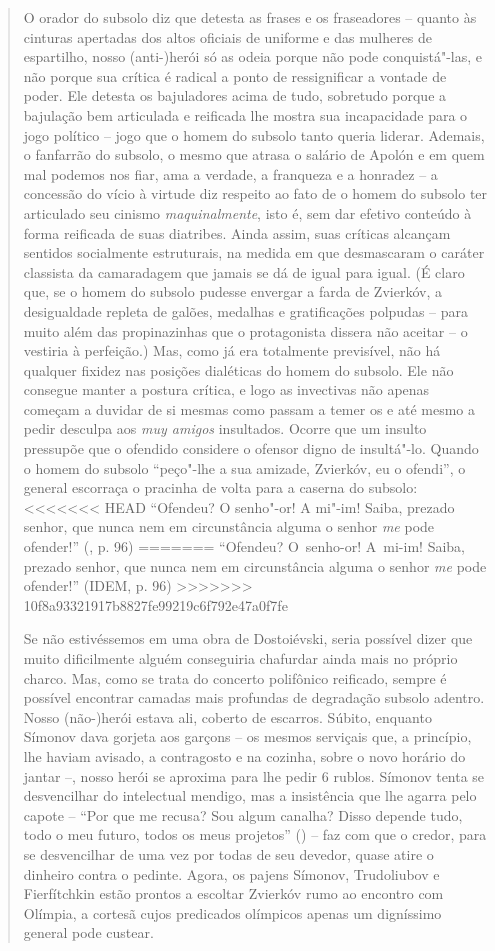 {\begin{quote}
O orador do subsolo diz que detesta as frases e os fraseadores -- quanto
às cinturas apertadas dos altos oficiais de uniforme e das mulheres de
espartilho, nosso (anti-)herói só as odeia porque não pode
conquistá"-las, e não porque sua crítica é radical a ponto de
ressignificar a vontade de poder. Ele detesta os bajuladores acima de
tudo, sobretudo porque a bajulação bem articulada e reificada lhe mostra
sua incapacidade para o jogo político -- jogo que o homem do subsolo
tanto queria liderar. Ademais, o fanfarrão do subsolo, o mesmo que
atrasa o salário de Apolón e em quem mal podemos nos fiar, ama a
verdade, a franqueza e a honradez -- a concessão do vício à virtude diz
respeito ao fato de o homem do subsolo ter articulado seu cinismo
\emph{maquinalmente}, isto é, sem dar efetivo conteúdo à forma reificada
de suas diatribes. Ainda assim, suas críticas alcançam sentidos
socialmente estruturais, na medida em que desmascaram o caráter
classista da camaradagem que jamais se dá de igual para igual. (É claro
que, se o homem do subsolo pudesse envergar a farda de Zvierkóv, a
desigualdade repleta de galões, medalhas e gratificações polpudas --
para muito além das propinazinhas que o protagonista dissera não aceitar
-- o vestiria à perfeição.) Mas, como já era totalmente previsível, não
há qualquer fixidez nas posições dialéticas do homem do subsolo. Ele não
consegue manter a postura crítica, e logo as invectivas não apenas
começam a duvidar de si mesmas como passam a temer os e até mesmo a
pedir desculpa aos \emph{muy amigos} insultados. Ocorre que um insulto
pressupõe que o ofendido considere o ofensor digno de insultá"-lo. Quando
o homem do subsolo ``peço"-lhe a sua amizade, Zvierkóv, eu o ofendi'', o
general escorraça o pracinha de volta para a caserna do subsolo:
<<<<<<< HEAD
``Ofendeu? O senho"-or! A mi"-im! Saiba, prezado senhor, que nunca nem em
circunstância alguma o senhor \emph{me} pode ofender!'' (, p. 96)
=======
``Ofendeu? O~senho-or! A~mi-im! Saiba, prezado senhor, que nunca nem em
circunstância alguma o senhor \emph{me} pode ofender!'' (IDEM, p. 96)
>>>>>>> 10f8a93321917b8827fe99219c6f792e47a0f7fe

Se não estivéssemos em uma obra de Dostoiévski, seria possível dizer que
muito dificilmente alguém conseguiria chafurdar ainda mais no próprio
charco. Mas, como se trata do concerto polifônico reificado, sempre é
possível encontrar camadas mais profundas de degradação subsolo adentro.
Nosso (não-)herói estava ali, coberto de escarros. Súbito, enquanto
Símonov dava gorjeta aos garçons -- os mesmos serviçais que, a
princípio, lhe haviam avisado, a contragosto e na cozinha, sobre o novo
horário do jantar --, nosso herói se aproxima para lhe pedir 6 rublos.
Símonov tenta se desvencilhar do intelectual mendigo, mas a insistência
que lhe agarra pelo capote -- ``Por que me recusa? Sou algum canalha?
Disso depende tudo, todo o meu futuro, todos os meus projetos'' ()
-- faz com que o credor, para se desvencilhar de uma vez por todas de
seu devedor, quase atire o dinheiro contra o pedinte. Agora, os pajens
Símonov, Trudoliubov e Fierfítchkin estão prontos a escoltar Zvierkóv
rumo ao encontro com Olímpia, a cortesã cujos predicados olímpicos
apenas um digníssimo general pode custear.


\end{quote}}
